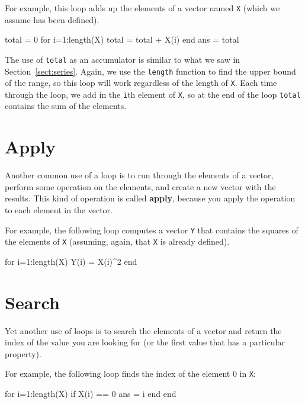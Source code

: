 \documentclass[
]{book}
\numberwithin{Answer}{chapter}
\numberwithin{Exercise}{chapter}
\begin{document}
For example, this loop adds up the elements of a vector named {\tt X}
(which we assume has been defined).

\begin{code}
total = 0
for i=1:length(X)
    total = total + X(i)
end
ans = total
\end{code}

The use of {\tt total} as an accumulator is similar to what we
saw in Section~\ref{sect:series}.  Again, we use the {\tt length} function
to find the upper bound of the range, so this loop will work
regardless of the length of {\tt X}.
Each time through the loop, we add
in the {\tt i}th element of {\tt X}, so at the end of the loop
{\tt total} contains the sum of the elements.


\section{Apply}
\label{sect:apply}

Another common use of a loop is to run through the elements of
a vector, perform some operation on the elements, and create
a new vector with the results.  This kind of operation is called
{\bf apply}, because you apply the operation to each element in
the vector.


For example, the following loop computes a vector {\tt Y} that
contains the squares of the elements of {\tt X} (assuming, again,
that {\tt X} is already defined).

\begin{code}
for i=1:length(X)
    Y(i) = X(i)^2
end
\end{code}


\section{Search}
\label{sect:search}

Yet another use of loops is to search the elements of a vector
and return the index of the value you are looking for (or the
first value that has a particular property).  


For example, the following loop finds the index of the element 0 in 
{\tt X}:

\begin{code}
for i=1:length(X)
    if X(i) == 0
        ans = i
    end
end
\end{code}
\end{document}
